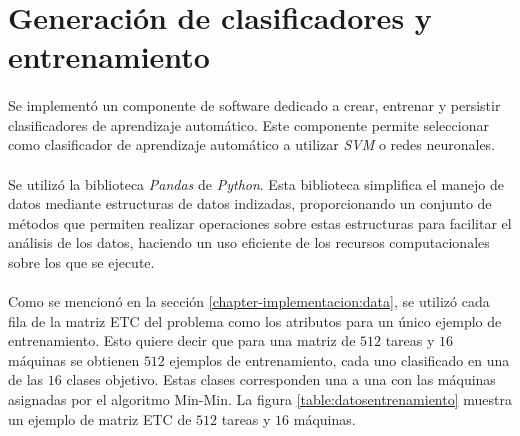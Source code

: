 \section{Generación de clasificadores y entrenamiento} \label{chapter-implementacion:clasificadores}

\paragraph{} Se implementó un componente de software dedicado a crear, entrenar y persistir clasificadores de aprendizaje automático.
Este componente permite seleccionar como clasificador de aprendizaje automático a utilizar \textit{SVM} o redes neuronales.

\paragraph{} Se utilizó la biblioteca \textit{Pandas}\cite{bib-pandas} de \textit{Python}.
Esta biblioteca simplifica el manejo de datos mediante estructuras de datos indizadas, proporcionando un conjunto de métodos que permiten realizar operaciones sobre estas estructuras para facilitar el análisis de los datos, haciendo un uso eficiente de los recursos computacionales sobre los que se ejecute.

\paragraph{} Como se mencionó en la sección \ref{chapter-implementacion:data}, se utilizó cada fila de la matriz ETC del problema como los atributos para un único ejemplo de entrenamiento.
Esto quiere decir que para una matriz de $512$ tareas y $16$ máquinas se obtienen $512$ ejemplos de entrenamiento, cada uno clasificado en una de las $16$ clases objetivo.
Estas clases corresponden una a una con las máquinas asignadas por el algoritmo Min-Min.
La figura \ref{table:datosentrenamiento} muestra un ejemplo de matriz ETC de $512$ tareas y $16$ máquinas.

